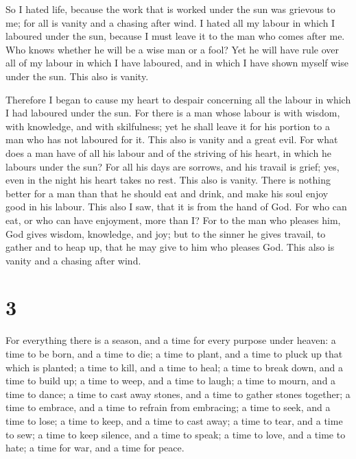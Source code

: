  So I hated life, because the work that is worked under
the sun was grievous to me; for all is vanity and a chasing after wind.
 I hated all my labour in which I laboured under the sun,
because I must leave it to the man who comes after me. 
Who knows whether he will be a wise man or a fool? Yet he will have rule
over all of my labour in which I have laboured, and in which I have
shown myself wise under the sun. This also is vanity.

 Therefore I began to cause my heart to despair
concerning all the labour in which I had laboured under the sun.
 For there is a man whose labour is with wisdom, with
knowledge, and with skilfulness; yet he shall leave it for his portion
to a man who has not laboured for it. This also is vanity and a great
evil.  For what does a man have of all his labour and of
the striving of his heart, in which he labours under the sun?
 For all his days are sorrows, and his travail is grief;
yes, even in the night his heart takes no rest. This also is vanity.
 There is nothing better for a man than that he should
eat and drink, and make his soul enjoy good in his labour. This also I
saw, that it is from the hand of God.  For who can eat,
or who can have enjoyment, more than I?  For to the man
who pleases him, God gives wisdom, knowledge, and joy; but to the sinner
he gives travail, to gather and to heap up, that he may give to him who
pleases God. This also is vanity and a chasing after wind.

\hypertarget{section-2}{%
\section{3}\label{section-2}}

 For everything there is a season, and a time for every
purpose under heaven:  a time to be born, and a time to
die; a time to plant, and a time to pluck up that which is planted;
 a time to kill, and a time to heal; a time to break down,
and a time to build up;  a time to weep, and a time to
laugh; a time to mourn, and a time to dance;  a time to
cast away stones, and a time to gather stones together; a time to
embrace, and a time to refrain from embracing;  a time to
seek, and a time to lose; a time to keep, and a time to cast away;
 a time to tear, and a time to sew; a time to keep
silence, and a time to speak;  a time to love, and a time
to hate; a time for war, and a time for peace.

